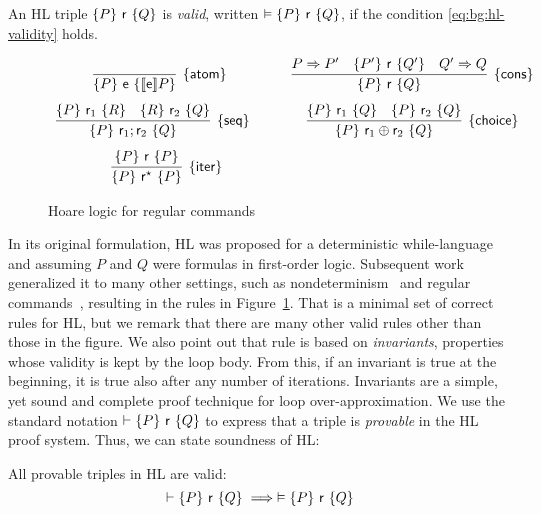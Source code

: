 \noindent
An HL triple $\{P\}~\mathsf{r}~\{Q\}$ is \emph{valid}, written $\vDash \{P\}~\mathsf{r}~\{Q\}$, if the condition \eqref{eq:bg:hl-validity} holds.

\begin{figure}[t]
	\centering
	\begin{framed}
		\(
		\begin{array}{cc}
			\infer[\hlrule{atom}]
			{\hltriple{P}{\expe}{\denot{\expe}P}}
			{}
			\quad                     &
			\infer[\hlrule{cons}]
			{\hltriple{P}{\regr}{Q}}
			{P \Rightarrow P'         & \hltriple{P'}{\regr}{Q'}  & Q' \Rightarrow Q}
			\\[7.5pt]
			\infer[\hlrule{seq}]
			{\hltriple{P}{\regr_1;\regr_2}{Q}}
			{\hltriple{P}{\regr_1}{R} & \hltriple{R}{\regr_2}{Q}}
			\qquad                    &
			\infer[\hlrule{choice}]
			{\hltriple{P}{\regr_1 \regplus \regr_2}{Q}}
			{\hltriple{P}{\regr_1}{Q} & \hltriple{P}{\regr_2}{Q}}
			\\[7.5pt]
			\infer[\hlrule{iter}]
			{\hltriple{P}{\regr^\kstar}{P}}
			{\hltriple{P}{\regr}{P}}
		\end{array}
		\)
	\end{framed}
	\vspace{-1ex}
	\caption{Hoare logic for regular commands}\label{fig:bg:hl}
\end{figure}
In its original formulation, HL was proposed for a deterministic while-language and assuming $P$ and $Q$ were formulas in first-order logic.
Subsequent work generalized it to many other settings, such as nondeterminism~\cite{Apt84} and regular commands~\cite{MOH21}, resulting in the rules in Figure~\ref{fig:bg:hl}.
That is a minimal set of correct rules for HL, but we remark that there are many other valid rules other than those in the figure. We also point out that rule  is based on \emph{invariants}, properties whose validity is kept by the loop body. From this, if an invariant is true at the beginning, it is true also after any number of iterations. Invariants are a simple, yet sound and complete proof technique for loop over-approximation.
We use the standard notation $\vdash \{P\}~\mathsf{r}~\{Q\}$ to express that a triple is \emph{provable} in the HL proof system.
Thus, we can state soundness of HL:

\begin{theorem}
	All provable triples in HL are valid:
	\[
	\vdash \{P\}~\mathsf{r}~\{Q\} \implies \vDash \{P\}~\mathsf{r}~\{Q\}
	\]
\end{theorem}


